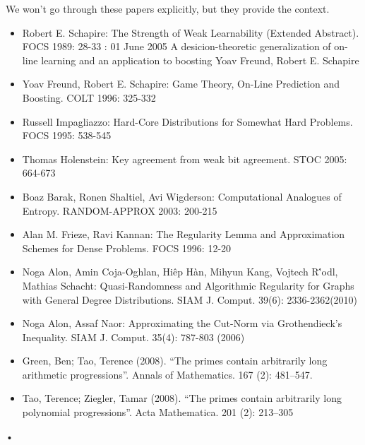 We won't go through these papers explicitly, but they provide the context.
\begin{itemize}
\item
Robert E. Schapire: The Strength of Weak Learnability (Extended Abstract). FOCS 1989: 28-33 : 01 June 2005 A desicion-theoretic generalization of on-line learning and an application to boosting Yoav Freund, Robert E. Schapire
\item
Yoav Freund, Robert E. Schapire: Game Theory, On-Line Prediction and Boosting. COLT 1996: 325-332
\item
Russell Impagliazzo: Hard-Core Distributions for Somewhat Hard Problems. FOCS 1995: 538-545
\item
Thomas Holenstein: Key agreement from weak bit agreement. STOC 2005: 664-673
\item
Boaz Barak, Ronen Shaltiel, Avi Wigderson: Computational Analogues of Entropy. RANDOM-APPROX 2003: 200-215
\item
Alan M. Frieze, Ravi Kannan: The Regularity Lemma and Approximation Schemes for Dense Problems. FOCS 1996: 12-20
\item
Noga Alon, Amin Coja-Oghlan, Hi\^ep H\`an, Mihyun Kang, Vojtech R\''odl, Mathias Schacht: Quasi-Randomness and Algorithmic Regularity for Graphs with General Degree Distributions. SIAM J. Comput. 39(6): 2336-2362(2010)
\item
Noga Alon, Assaf Naor: Approximating the Cut-Norm via Grothendieck's Inequality. SIAM J. Comput. 35(4): 787-803 (2006)
\item
Green, Ben; Tao, Terence (2008). ``The primes contain arbitrarily long arithmetic progressions''. Annals of Mathematics. 167 (2): 481–547.
\item
Tao, Terence; Ziegler, Tamar (2008). ``The primes contain arbitrarily long polynomial progressions''. Acta Mathematica. 201 (2): 213–305
\end{itemize}•
